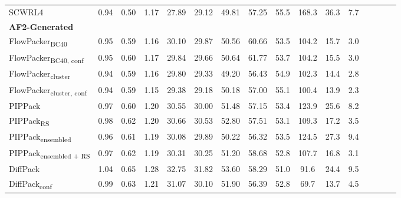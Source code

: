 \begin{table}
{\begin{tabular}{@{}lccccccccccccccc@{}}
                \textnormal{\hspace{0.5cm}SCWRL4} & 0.94 & 0.50 & 1.17 & 27.89 & 29.12 & 49.81 & 57.25 & 55.5 & 168.3 & 36.3 & 7.7 \\
            \textbf{AF2-Generated} & & & & & & & & & \\ 
                \textnormal{\hspace{0.5cm}FlowPacker\textsubscript{BC40}} & 0.95 & 0.59 & 1.16 & 30.10 & 29.87 & 50.56 & 60.66 & 53.5 & 104.2 & 15.7 & 3.0 \\
                \textnormal{\hspace{0.5cm}FlowPacker\textsubscript{BC40, conf}} & 0.95 & 0.60 & 1.17 & 29.84 & 29.66 & 50.64 & 61.77 & 53.7 & 104.2 & 15.5 & 3.0 \\
                \textnormal{\hspace{0.5cm}FlowPacker\textsubscript{cluster}} & 0.94 & 0.59 & 1.16 & 29.80 & 29.33 & 49.20 & 56.43 & 54.9 & 102.3 & 14.4 & 2.8 \\
                \textnormal{\hspace{0.5cm}FlowPacker\textsubscript{cluster, conf}} & 0.94 & 0.59 & 1.15 & 29.38 & 29.18 & 50.18 & 57.00 & 55.1 & 100.4 & 13.9 & 2.3 \\
                \textnormal{\hspace{0.5cm}PIPPack} & 0.97 & 0.60 & 1.20 & 30.55 & 30.00 & 51.48 & 57.15 & 53.4 & 123.9 & 25.6 & 8.2 \\
                \textnormal{\hspace{0.5cm}PIPPack\textsubscript{RS}} & 0.98 & 0.62 & 1.20 & 30.66 & 30.53 & 52.80 & 57.51 & 53.1 & 109.3 & 17.2 & 3.5 \\
                \textnormal{\hspace{0.5cm}PIPPack\textsubscript{ensembled}} & 0.96 & 0.61 & 1.19 & 30.08 & 29.89 & 50.22 & 56.32 & 53.5 & 124.5 & 27.3 & 9.4 \\
                \textnormal{\hspace{0.5cm}PIPPack\textsubscript{ensembled + RS}} & 0.97 & 0.62 & 1.19 & 30.31 & 30.25 & 51.20 & 58.68 & 52.8 & 107.7 & 16.8 & 3.1 \\
                \textnormal{\hspace{0.5cm}DiffPack} & 1.04 & 0.65 & 1.28 & 32.75 & 31.82 & 53.60 & 58.29 & 51.0 & 91.6 & 24.4 & 9.5 \\
                \textnormal{\hspace{0.5cm}DiffPack\textsubscript{conf}} & 0.99 & 0.63 & 1.21 & 31.07 & 30.10 & 51.90 & 56.39 & 52.8 & 69.7 & 13.7 & 4.5 \\

\end{tabular}}
\end{table}
